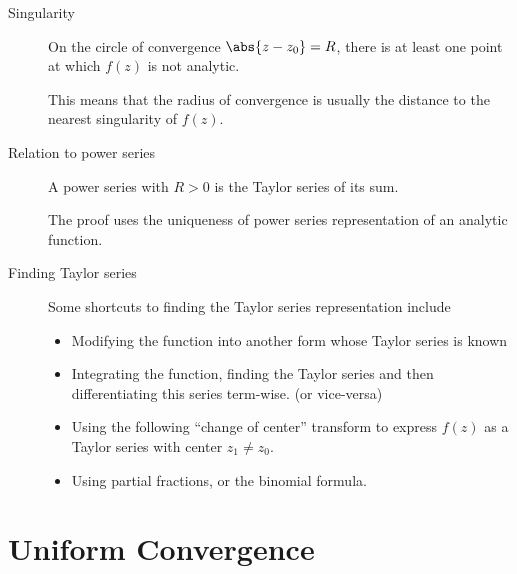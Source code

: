 \begin{description}
    \item[Singularity] On the circle of convergence $ \abs{z - z_0} = R $, there is
        at least one point at which $ f(z) $ is not analytic. \par
        This means that the radius of convergence is usually the distance to the
        nearest singularity of $ f(z) $.

    \item[Relation to power series] A power series with $ R > 0 $ is the Taylor
        series of its sum. \par
        The proof uses the uniqueness of power series representation of an analytic
        function.

    \item[Finding Taylor series] Some shortcuts to finding the Taylor series
        representation include
        \begin{itemize}
            \item Modifying the function into another form whose Taylor series is known
            \item Integrating the function, finding the Taylor series and then
                  differentiating this series term-wise. (or vice-versa)
            \item Using the following ``change of center'' transform to express
                  $ f(z) $ as a Taylor series with center $ z_1 \neq z_0 $.
            \item Using partial fractions, or the binomial formula.
        \end{itemize}
\end{description}

\section{Uniform Convergence}

